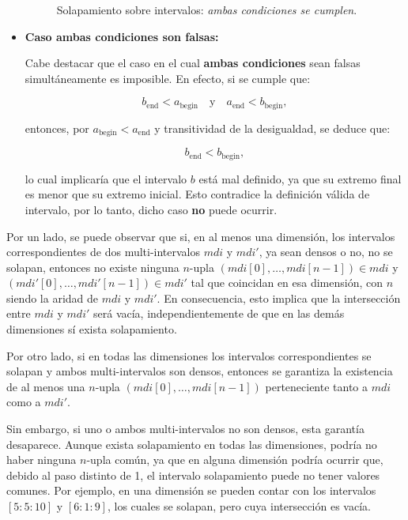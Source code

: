 \begin{itemize}
\begin{figure}[H]
    \caption{Solapamiento sobre intervalos: \textit{ambas condiciones se cumplen}.}
    \label{fig:crit-solapamiento}
\end{figure}
        \item \textbf{Caso ambas condiciones son falsas:}
        
        Cabe destacar que el caso en el cual \textbf{ambas condiciones} sean falsas simultáneamente es imposible. En efecto, si se cumple que:

        \[
        b_{\text{end}} < a_{\text{begin}} \quad \text{y} \quad a_{\text{end}} < b_{\text{begin}},
        \]
        
        entonces, por $a_{\text{begin}} < a_{\text{end}}$ y transitividad de la desigualdad, se deduce que:
        
        \[
        b_{\text{end}} < b_{\text{begin}},
        \]
        
        lo cual implicaría que el intervalo $b$ está mal definido, ya que su extremo final es menor que su extremo inicial. Esto contradice la definición válida de intervalo, por lo tanto, dicho caso \textbf{no} puede ocurrir.
\end{itemize}


Por un lado, se puede observar que si, en al menos una dimensión, los intervalos correspondientes de dos multi-intervalos $mdi$ y $mdi'$, ya sean densos o no, no se solapan, entonces no existe ninguna $n$-upla $(mdi[0], \dots, mdi[n-1]) \in mdi$ y $(mdi'[0], \dots, mdi'[n-1]) \in mdi'$ tal que coincidan en esa dimensión, con $n$ siendo la aridad de $mdi$ y $mdi'$. En consecuencia, esto implica que la intersección entre $mdi$ y $mdi'$ será vacía, independientemente de que en las demás dimensiones sí exista solapamiento.

Por otro lado, si en todas las dimensiones los intervalos correspondientes se solapan y ambos multi-intervalos son densos, entonces se garantiza la existencia de al menos una $n$-upla $(mdi[0], \dots, mdi[n-1])$ perteneciente tanto a $mdi$ como a $mdi'$.

Sin embargo, si uno o ambos multi-intervalos no son densos, esta garantía desaparece. Aunque exista solapamiento en todas las dimensiones, podría no haber ninguna $n$-upla común, ya que en alguna dimensión podría ocurrir que, debido al paso distinto de 1, el intervalo solapamiento puede no tener valores comunes. Por ejemplo, en una dimensión se pueden contar con los intervalos $[5:5:10]$ y $[6:1:9]$, los cuales se solapan, pero cuya intersección es vacía. 

